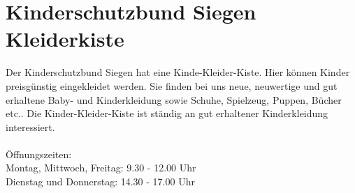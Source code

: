 \section{Kinderschutzbund Siegen Kleiderkiste}
Der Kinderschutzbund Siegen hat eine Kinde-Kleider-Kiste. Hier können Kinder preisgünstig eingekleidet werden. Sie finden bei uns neue, neuwertige und gut erhaltene Baby- und Kinderkleidung sowie Schuhe, Spielzeug, Puppen, Bücher etc.. Die Kinder-Kleider-Kiste ist ständig an gut erhaltener Kinderkleidung interessiert.\\
\\
Öffnungszeiten: \\
Montag, Mittwoch, Freitag: 9.30 - 12.00 Uhr \\
Dienstag und Donnerstag: 14.30 - 17.00 Uhr